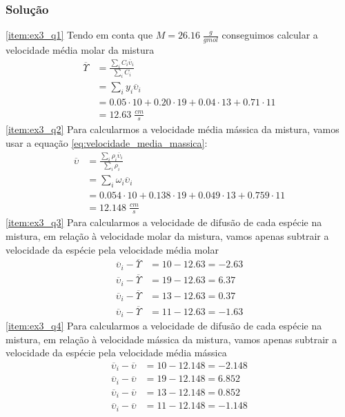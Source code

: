 \subsubsection{Solução}
\ref{item:ex3_q1} Tendo em conta que \(M = 26.16 \; \frac{g}{gmol}\) conseguimos calcular a
velocidade média molar da mistura
\begin{align}
    \overline{\Upsilon } &= \frac{\sum_{i} C_i \overline{\upsilon }_{i} }{\sum_{i} C_i }\\
    & = \sum_{i} y_{i} \overline{\upsilon }_{i} \\
    & = 0.05 \cdot 10 + 0.20 \cdot 19 + 0.04 \cdot 13 + 0.71 \cdot 11 \\
    & = 12.63 \; \frac{cm}{s}
\end{align}
\ref{item:ex3_q2} Para calcularmos a velocidade média mássica da mistura, vamos usar a equação
\ref{eq:velocidade_media_massica}:
\begin{align}
    \overline{\upsilon } &= \frac{\sum_{i} \rho _{i} \overline{\upsilon }_{i} }{\sum_{i} \rho _{i} } \\
    & = \sum_{i} \omega _{i} \overline{\upsilon } _{i} \\
    & = 0.054 \cdot 10 + 0.138 \cdot 19 + 0.049 \cdot 13 + 0.759 \cdot 11 \\
    & = 12.148 \; \frac{cm}{s}
\end{align}
\ref{item:ex3_q3} Para calcularmos a velocidade de difusão de cada espécie na mistura, em relação à
velocidade molar da mistura, vamos apenas subtrair a velocidade da espécie pela velocidade média molar
\begin{align}
    \overline{\upsilon } _{i} - \overline{\Upsilon } &= 10 - 12.63 = -2.63 \\
    \overline{\upsilon } _{i} - \overline{\Upsilon } &= 19 - 12.63 = 6.37 \\
    \overline{\upsilon } _{i} - \overline{\Upsilon } &= 13 - 12.63 = 0.37 \\
    \overline{\upsilon } _{i} - \overline{\Upsilon } &= 11 - 12.63 = -1.63
\end{align}
\ref{item:ex3_q4} Para calcularmos a velocidade de difusão de cada espécie na mistura, em relação à
velocidade mássica da mistura, vamos apenas subtrair a velocidade da espécie pela velocidade média
mássica
\begin{align}
    \overline{\upsilon } _{i} - \overline{\upsilon } &= 10 - 12.148 = -2.148 \\
    \overline{\upsilon } _{i} - \overline{\upsilon } &= 19 - 12.148 = 6.852 \\
    \overline{\upsilon } _{i} - \overline{\upsilon } &= 13 - 12.148 = 0.852 \\
    \overline{\upsilon } _{i} - \overline{\upsilon } &= 11 - 12.148 = -1.148
\end{align}
